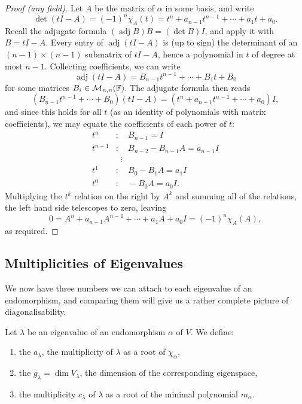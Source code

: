 \documentclass[a4paper]{scrartcl}
\newcommand{\adj}{\operatorname{adj}}
\begin{document}
\begin{proof}[Proof (any field)]
    Let $A$ be the matrix of $\alpha$ in some basis, and write
    $$
    \det(tI - A) = (-1)^n \chi_A(t) = t^n + a_{n -1}t^{n-1} + \cdots + a_1 t + a_0.
    $$
    Recall the adjugate formula $(\adj B) B = (\det B) I$, and apply it with $B = tI - A$. Every entry of $\adj(tI - A)$ is (up to sign) the determinant of an $(n-1) \times (n-1)$ submatrix of $tI - A$, hence a polynomial in $t$ of degree at most $n - 1$. Collecting coefficients, we can write
    $$
    \adj(tI - A) = B_{n-1}t^{n-1} + \cdots + B_1 t + B_0
    $$
    for some matrices $B_i \in \mathcal{M}_{n,n}(\mathbb{F})$. The adjugate formula then reads
    $$
    (B_{n-1}t^{n - 1} + \cdots + B_0)(tI - A) = (t^n + a_{n-1}t^{n-1} + \cdots + a_0) I,
    $$
    and since this holds for all $t$ (as an identity of polynomials with matrix coefficients), we may equate the coefficients of each power of $t$:
    \begin{align*}
        t^n &: \quad B_{n - 1} = I \\
        t^{n-1} &: \quad B_{n-2} - B_{n-1}A = a_{n-1}I\\
        &\;\; \vdots\\
        t^1 &: \quad B_0 - B_1 A = a_1 I \\
        t^0 &: \quad -B_0 A = a_0 I.
    \end{align*}
    Multiplying the $t^k$ relation on the right by $A^k$ and summing all of the relations, the left hand side telescopes to zero, leaving
    $$
    0 = A^n + a_{n-1}A^{n-1} + \cdots + a_1 A + a_0 I = (-1)^n\chi_A(A),
    $$
    as required.
\end{proof}

\subsection{Multiplicities of Eigenvalues}

We now have three numbers we can attach to each eigenvalue of an endomorphism, and comparing them will give us a rather complete picture of diagonalisability.

\begin{definition}
    Let $\lambda$ be an eigenvalue of an endomorphism $\alpha$ of $V$. We define:
    \begin{enumerate}[label=(\roman*)]
        \item the  $a_\lambda$, the multiplicity of $\lambda$ as a root of $\chi_\alpha$,
        \item the  $g_\lambda = \dim V_\lambda$, the dimension of the corresponding eigenspace,
        \item the multiplicity $c_\lambda$ of $\lambda$ as a root of the minimal polynomial $m_\alpha$.
    \end{enumerate}
\end{definition}
\end{document}
